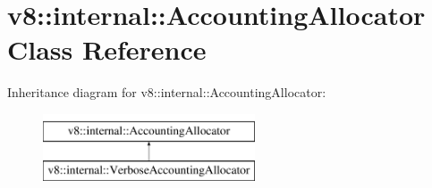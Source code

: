 \hypertarget{classv8_1_1internal_1_1AccountingAllocator}{}\section{v8\+:\+:internal\+:\+:Accounting\+Allocator Class Reference}
\label{classv8_1_1internal_1_1AccountingAllocator}
Inheritance diagram for v8\+:\+:internal\+:\+:Accounting\+Allocator\+:\begin{figure}[H]
\begin{center}
\leavevmode
\includegraphics[height=2.000000cm]{classv8_1_1internal_1_1AccountingAllocator}
\end{center}
\end{figure}
